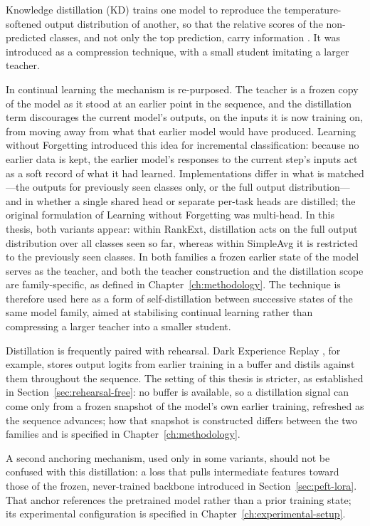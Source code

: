 Knowledge distillation (KD) trains one model to reproduce the
temperature-softened output distribution of another, so that the relative
scores of the non-predicted classes, and not only the top prediction,
carry information \parencite{hinton2015distilling}. It was introduced as a compression
technique, with a small student imitating a larger teacher.

In continual learning the mechanism is re-purposed. The teacher is a frozen
copy of the model as it stood at an earlier point in the sequence, and the
distillation term discourages the current model's outputs, on the inputs it
is now training on, from moving away from what that earlier model would have
produced. Learning without Forgetting \parencite{li2016learning} introduced this
idea for incremental classification: because no earlier data is kept, the
earlier model's responses to the current step's inputs act as a soft record
of what it had learned. Implementations differ in what is matched---the
outputs for previously seen classes only, or the full output distribution---%
and in whether a single shared head or separate per-task heads are
distilled; the original formulation of Learning without Forgetting was
multi-head. In this thesis, both variants appear: within RankExt,
distillation acts on the full output distribution over all classes seen so
far, whereas within SimpleAvg it is restricted to the previously seen
classes. In both families a frozen earlier state of the model serves as
the teacher, and both the teacher construction and the distillation scope
are family-specific, as defined in Chapter~\ref{ch:methodology}. The technique is therefore used here as a
form of self-distillation between successive states of the same model
family, aimed at stabilising continual learning rather than compressing a
larger teacher into a smaller student.

Distillation is frequently paired with rehearsal. Dark Experience Replay
\parencite{buzzega2020dark}, for example, stores output logits from earlier
training in a buffer and distils against them throughout the sequence. The
setting of this thesis is stricter, as established in Section~\ref{sec:rehearsal-free}: no
buffer is available, so a distillation signal can come only from a frozen
snapshot of the model's own earlier training, refreshed as the sequence
advances; how that snapshot is constructed differs between the two families
and is specified in Chapter~\ref{ch:methodology}.

A second anchoring mechanism, used only in some variants, should not be
confused with this distillation: a loss that pulls intermediate features
toward those of the frozen, never-trained backbone introduced in Section~\ref{sec:peft-lora}.
That anchor references the pretrained model rather than a prior
training state; its experimental configuration is specified in
Chapter~\ref{ch:experimental-setup}.

